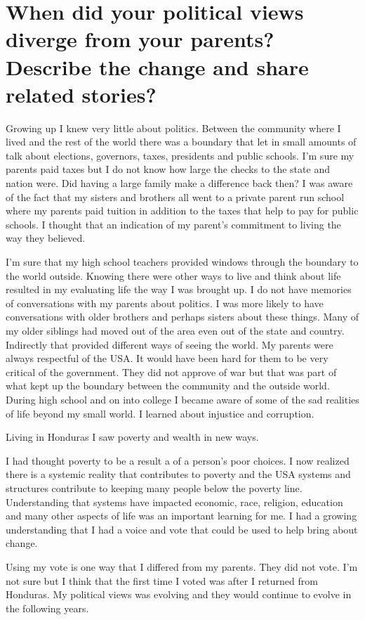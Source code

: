 \section{When did your political views diverge from your parents? Describe the change and share related stories?}
Growing up I knew very little about politics.
Between the community where I lived and the rest of the world there was a boundary that let in small amounts of talk about elections, governors, taxes, presidents and public schools.
I'm sure my parents paid taxes but I do not know how large the checks to the state and nation were.
Did having a large family make a difference back then? I was aware of the fact that my sisters and brothers all went to a private parent run school where my parents paid tuition in addition to the taxes that help to pay for public schools.
I thought that an indication of my parent's commitment to living the way they believed.

I'm sure that my high school teachers provided windows through the boundary to the world outside.
Knowing there were other ways to live and think about life resulted in my evaluating life the way I was brought up.
I do not have memories of conversations with my parents about politics.
I was more likely to have conversations with older brothers and perhaps sisters about these things.
Many of my older siblings had moved out of the area even out of the state and country.
Indirectly that provided different ways of seeing the world.
My parents were always respectful of the USA.
It would have been hard for them to be very critical of the government.
They did not approve of war but that was part of what kept up the boundary between the community and the outside world.
During high school and on into college I became aware of some of the sad realities of life beyond my small world.
I learned about injustice and corruption.

Living in Honduras I saw poverty and wealth in new ways.

I had thought poverty to be a result a of a person's poor choices.
I now realized there is a systemic reality that contributes to poverty and the USA systems and structures contribute to keeping many people below the poverty line.
Understanding that systems have impacted economic, race, religion, education and many other aspects of life was an important learning for me.
I had a growing understanding that I had a voice and vote that could be used to help bring about change.

Using my vote is one way that I differed from my parents.
They did not vote.
I'm not sure but I think that the first time I voted was after I returned from Honduras.
My political views was evolving and they would continue to evolve in the following years.

